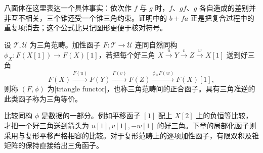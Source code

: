 八面体在这里表达一个具体事实：依次作 \(f\) 与 \(g\) 时，\(f\)、\(gf\)、\(g\) 各自造成的差别并非互不相关，三个锥还受一个锥三角约束。证明中的 \(b+fa\) 正是把复合过程中的重复项消去；这个公式比只记图形更便于核对符号。

\begin{definition}\label{b4:def:triangle-functor}
设 \(\mathcal T,\mathcal U\) 为三角范畴。加性函子 \(F:\mathcal T\to\mathcal U\) 连同自然同构 \(\phi_X:F(X[1])\to F(X)[1]\)，若把每个好三角 \(X\xrightarrow{u}Y\xrightarrow{v}Z\xrightarrow{w}X[1]\) 送到好三角
\[
 F(X)\xrightarrow{F(u)}F(Y)\xrightarrow{F(v)}F(Z)
 \xrightarrow{\phi_XF(w)}F(X)[1],
\]
则称 \((F,\phi)\) 为[triangle functor]，也称三角范畴间的正合函子。具有三角准逆的此类函子称为三角等价。
\end{definition}

比较同构 \(\phi\) 是数据的一部分。例如平移函子 \([1]\) 配上 \(X[2]\) 上的负恒等比较，才把一个好三角送到箭头为 \(u[1],v[1],-w[1]\) 的好三角。下章的局部化函子则采用与复形平移严格相容的比较。对于复形范畴上的逐项加性函子，有限双积及锥矩阵的保持直接给出三角函子。
